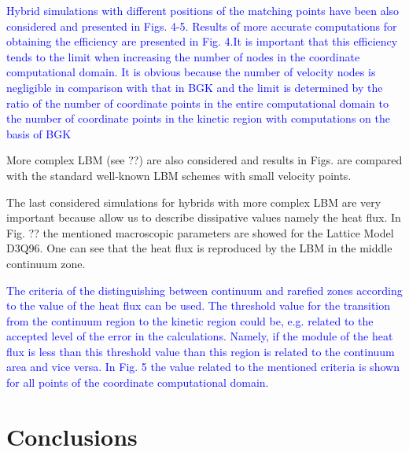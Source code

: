 \documentclass[]{elsarticle} %
\begin{document}
{\textcolor{blue} {Hybrid simulations with different positions of the matching points have been also considered and presented in Figs. 4-5.}
\textcolor{blue} {Results of more accurate computations for obtaining the efficiency are presented in Fig. 4.It is important that this efficiency tends to the limit when increasing the number of nodes in the coordinate computational domain. It is obvious because the number of velocity nodes is negligible in comparison with that in BGK and the limit is determined by the ratio of the number of coordinate points in the entire computational domain to the number of coordinate points in the kinetic region with computations on the basis of BGK}

More complex LBM (see ??)  are also considered and results in Figs.  are compared with the standard  well-known LBM schemes with small velocity points.

The last considered simulations for hybrids with more complex LBM are very important because allow us to describe dissipative values namely the heat flux. In Fig. ?? the mentioned macroscopic parameters are showed for the Lattice Model D3Q96. One can see that the heat flux is reproduced by the LBM in the middle continuum zone.

\textcolor{blue} {The criteria of the distinguishing between continuum and rarefied zones according to the value of the heat flux can be used. The threshold value for the transition from the continuum region to the kinetic region could be, e.g. related to the accepted level of the error in the calculations. Namely, if the module of the heat flux is less than this threshold value than this region is related to the continuum area and vice versa. In Fig. 5 the value related to the mentioned criteria is shown for all points of the coordinate computational domain.}

\section{Conclusions}\label{sec:summary}

}
\end{document}
